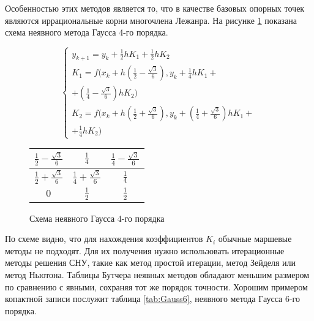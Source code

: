 Особенностью этих методов является то, что в качестве базовых опорных точек являются иррациональные корни многочлена Лежанра.
На рисунке \ref{fig:Gauss4} показана схема неявного метода Гаусса 4-го порядка.

\begin{figure}
    \begin{minipage}[t]{8.5cm}
        {\small
        \begin{equation*}
            \begin{cases}
                y_{k + 1} = y_k + \frac{1}{2}hK_1 + \frac{1}{2}hK_2\\
                K_1 = f(x_k + h(\frac{1}{2} - \frac{\sqrt{3}}{6}), y_k + \frac{1}{4}hK_1 +\\
                + (\frac{1}{4} - \frac{\sqrt{3}}{6})hK_2)\\
                K_2 = f(x_k + h(\frac{1}{2} + \frac{\sqrt{3}}{6}), y_k + (\frac{1}{4} + \frac{\sqrt{3}}{6})hK_1 +\\
                + \frac{1}{4}hK_2)
            \end{cases}
        \end{equation*}
        }
    \end{minipage}
    \begin{minipage}[t]{7.5cm}
        \begin{table}    
            \begin{tabular}{|c|c|c|}
            \hline
            $\frac{1}{2} - \frac{\sqrt{3}}{6}$ & $\frac{1}{4}$ & $\frac{1}{4} - \frac{\sqrt{3}}{6}$\\
            \hline
            $\frac{1}{2} + \frac{\sqrt{3}}{6}$ & $\frac{1}{4} + \frac{\sqrt{3}}{6}$ & $\frac{1}{4}$\\
            \hline
            $0$ & \cellcolor{lightgray} $\frac{1}{2}$ & \cellcolor{lightgray} $\frac{1}{2}$\\
            \hline
            \end{tabular}
        \end{table}
    \end{minipage}
    \caption{Схема неявного Гаусса 4-го порядка}
    \label{fig:Gauss4}
\end{figure}

По схеме видно, что для нахождения коэффициентов $K_i$ обычные маршевые методы не подходят. Для их получения нужно использовать
итерационные методы решения СНУ, такие как метод простой итерации, метод Зейделя или метод Ньютона. Таблицы Бутчера неявных методов обладают
меньшим размером по сравнению с явными, сохраняя тот же порядок точности. Хорошим примером копактной записи послужит
таблица \ref{tab:Gauss6}, неявного метода Гаусса 6-го порядка.

